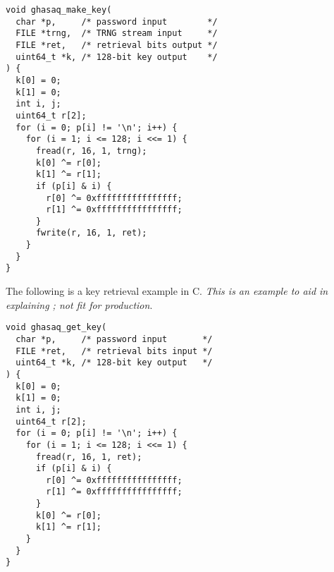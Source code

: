 \documentclass[twocolumn,hidelinks]{article}
\begin{document}
\begin{verbatim}
void ghasaq_make_key(
  char *p,     /* password input        */
  FILE *trng,  /* TRNG stream input     */
  FILE *ret,   /* retrieval bits output */
  uint64_t *k, /* 128-bit key output    */
) {
  k[0] = 0;
  k[1] = 0;
  int i, j;
  uint64_t r[2];
  for (i = 0; p[i] != '\n'; i++) {
    for (i = 1; i <= 128; i <<= 1) {
      fread(r, 16, 1, trng);
      k[0] ^= r[0];
      k[1] ^= r[1];
      if (p[i] & i) {
        r[0] ^= 0xffffffffffffffff;
        r[1] ^= 0xffffffffffffffff;
      }
      fwrite(r, 16, 1, ret);
    }
  }
}
\end{verbatim}

The following is a key retrieval example in C.  \emph{This is an example to
aid in explaining ; not fit for production}.

\begin{verbatim}
void ghasaq_get_key(
  char *p,     /* password input       */
  FILE *ret,   /* retrieval bits input */
  uint64_t *k, /* 128-bit key output   */
) {
  k[0] = 0;
  k[1] = 0;
  int i, j;
  uint64_t r[2];
  for (i = 0; p[i] != '\n'; i++) {
    for (i = 1; i <= 128; i <<= 1) {
      fread(r, 16, 1, ret);
      if (p[i] & i) {
        r[0] ^= 0xffffffffffffffff;
        r[1] ^= 0xffffffffffffffff;
      }
      k[0] ^= r[0];
      k[1] ^= r[1];
    }
  }
}
\end{verbatim}
\end{document}
